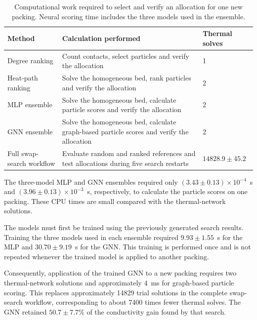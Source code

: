 \documentclass[12pt,a4paper]{article}
\begin{document}
\begin{table}[!htbp]
	\centering
	\caption{Computational work required to select and verify an allocation for
		one new packing. Neural scoring time includes the three models used in the
		ensemble.}
	\label{tab:cost}
	\small
	\begin{tabular}{P{3.5cm}P{6.2cm}P{2.7cm}}
		\toprule
		\textbf{Method} &
		\textbf{Calculation performed} &
		\textbf{Thermal solves} \\
		\midrule
		Degree ranking &
		Count contacts, select particles and verify the allocation &
		1 \\
		
		Heat-path ranking &
		Solve the homogeneous bed, rank particles and verify the allocation &
		2 \\
		
		MLP ensemble &
		Solve the homogeneous bed, calculate particle scores and verify the
		allocation &
		2 \\
		
		GNN ensemble &
		Solve the homogeneous bed, calculate graph-based particle scores and
		verify the allocation &
		2 \\
		
		Full swap-search workflow &
		Evaluate random and ranked references and test allocations during five
		search restarts &
		$14828.9\pm45.2$ \\
		\bottomrule
	\end{tabular}
\end{table}

The three-model MLP and GNN ensembles required only
$(3.43\pm0.13)\times10^{-4}$~s and
$(3.96\pm0.13)\times10^{-3}$~s, respectively, to calculate the particle scores
on one packing. These CPU times are small compared with the thermal-network
solutions.

The models must first be trained using the previously generated search results.
Training the three models used in each ensemble required
$9.93\pm1.55$~s for the MLP and $30.70\pm9.19$~s for the GNN. This training is
performed once and is not repeated whenever the trained model is applied to
another packing.

Consequently, application of the trained GNN to a new packing requires two
thermal-network solutions and approximately 4~ms for graph-based particle
scoring. This replaces approximately 14829 trial solutions in the complete
swap-search workflow, corresponding to about 7400 times fewer thermal solves.
The GNN retained $50.7\pm7.7$\% of the conductivity gain found by that search.
	
\end{document}
